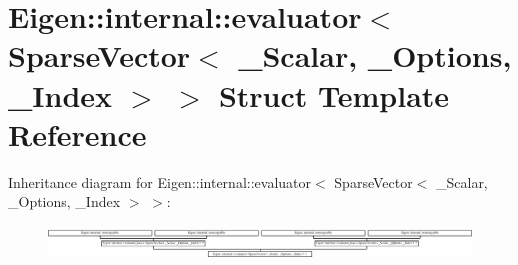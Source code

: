 \hypertarget{struct_eigen_1_1internal_1_1evaluator_3_01_sparse_vector_3_01___scalar_00_01___options_00_01___index_01_4_01_4}{}\section{Eigen\+:\+:internal\+:\+:evaluator$<$ Sparse\+Vector$<$ \+\_\+\+Scalar, \+\_\+\+Options, \+\_\+\+Index $>$ $>$ Struct Template Reference}
\label{struct_eigen_1_1internal_1_1evaluator_3_01_sparse_vector_3_01___scalar_00_01___options_00_01___index_01_4_01_4}
Inheritance diagram for Eigen\+:\+:internal\+:\+:evaluator$<$ Sparse\+Vector$<$ \+\_\+\+Scalar, \+\_\+\+Options, \+\_\+\+Index $>$ $>$\+:\begin{figure}[H]
\begin{center}
\leavevmode
\includegraphics[height=0.897436cm]{struct_eigen_1_1internal_1_1evaluator_3_01_sparse_vector_3_01___scalar_00_01___options_00_01___index_01_4_01_4}
\end{center}
\end{figure}
